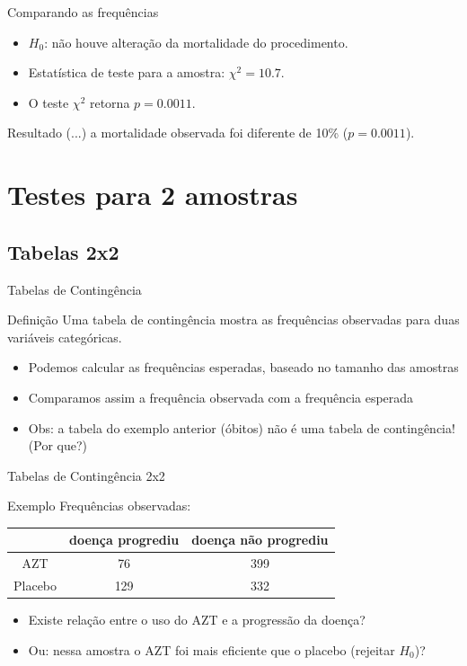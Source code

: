 \documentclass{beamer}
\begin{document}
\begin{frame}{Comparando as frequências}
  \begin{itemize}
    \footnotesize
  \item $H_0$: não houve alteração da mortalidade do procedimento.
  \item Estatística de teste para a amostra: $\chi^2 = 10.7$.
  \item O teste $\chi^2$ retorna $p=0.0011$.
  \end{itemize}
  \bigskip
  \begin{block}{Resultado}
    \small
    (...) a mortalidade observada foi diferente de 10\% ($p=0.0011$).
  \end{block}
\end{frame}

\section[2 amostras]{Testes para 2 amostras}

\subsection{Tabelas 2x2}

\begin{frame}{Tabelas de Contingência}
  \begin{block}{Definição}
    Uma \alert{tabela de contingência} mostra as frequências
    observadas para duas variáveis categóricas.
  \end{block}
  \begin{itemize}
  \item Podemos calcular as frequências esperadas, baseado no tamanho
    das amostras
  \item Comparamos assim a frequência observada com a frequência
    esperada
  \item Obs: a tabela do exemplo anterior (óbitos) \alert{não é} uma
    tabela de contingência! (Por que?)
  \end{itemize}
\end{frame}

\begin{frame}[label=exemplo8.1]{Tabelas de Contingência 2x2}
  \begin{exampleblock}{Exemplo}
    Frequências observadas:
    \begin{tabular}{c|c|c}
      & doença progrediu & doença não progrediu\\
      \hline
      AZT & 76 & 399 \\
      \hline
      Placebo & 129 & 332 \\
    \end{tabular}
  \end{exampleblock}
  \begin{itemize}
  \item Existe relação entre o uso do AZT e a progressão da doença?
  \item Ou: nessa amostra o AZT foi mais eficiente que o placebo
    (rejeitar $H_0$)?
  \end{itemize}
\end{frame}
\end{document}
